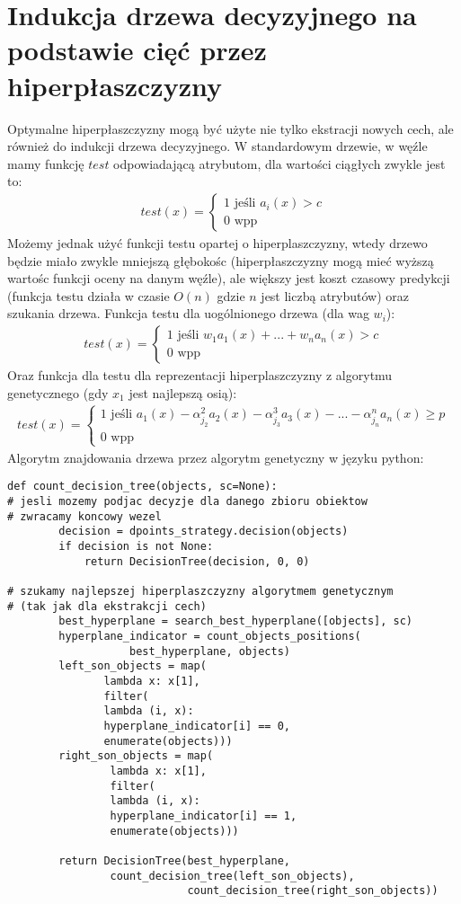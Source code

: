 \documentclass[magisterska]{pracamgr}
\theoremstyle{plain}
\theoremstyle{definition}
\theoremstyle{remark}
\begin{document}
\section{Indukcja drzewa decyzyjnego na podstawie cięć przez hiperpłaszczyzny}
Optymalne hiperpłaszczyzny mogą być użyte nie tylko ekstracji nowych cech, ale również do indukcji drzewa
decyzyjnego. W standardowym drzewie, w węźle mamy funkcję $test$ odpowiadającą atrybutom, dla wartości ciągłych zwykle
jest to:
\begin{align*}
test(x) = \begin{cases} 1 \text{ jeśli } a_i(x) > c \\ 0 \text{ wpp } \end{cases}
\end{align*}
Możemy jednak użyć funkcji testu opartej o hiperplaszczyzny, wtedy drzewo będzie miało zwykle mniejszą głębokośc
(hiperpłaszczyzny mogą mieć wyższą wartośc funkcji oceny na danym węźle), ale większy jest koszt czasowy predykcji
(funkcja testu działa w czasie $O(n)$ gdzie $n$ jest liczbą atrybutów) oraz szukania drzewa. Funkcja testu dla 
uogólnionego drzewa (dla wag $w_i$):
  \begin{align*}
test(x) = \begin{cases} 1 \text{ jeśli } w_1 a_1(x) + ... + w_n a_n(x) > c \\ 0 \text{ wpp } \end{cases}
\end{align*}
Oraz funkcja dla testu dla reprezentacji hiperplaszczyzny z algorytmu genetycznego (gdy $x_1$ jest najlepszą osią):
\begin{align*}
 test(x) = \begin{cases} 1 \text{ jeśli } a_1(x) - \alpha_{j_2}^2 a_2(x) - \alpha_{j_3}^3 a_3(x) - 
 ... - \alpha_{j_n}^n a_n(x) \geq p \\ 0 \text{ wpp } \end{cases}
\end{align*}
Algorytm znajdowania drzewa przez algorytm genetyczny w języku python:
\begin{lstlisting}
def count_decision_tree(objects, sc=None):
# jesli mozemy podjac decyzje dla danego zbioru obiektow
# zwracamy koncowy wezel
        decision = dpoints_strategy.decision(objects)
        if decision is not None:
            return DecisionTree(decision, 0, 0)

# szukamy najlepszej hiperplaszczyzny algorytmem genetycznym
# (tak jak dla ekstrakcji cech)
        best_hyperplane = search_best_hyperplane([objects], sc)
        hyperplane_indicator = count_objects_positions(
			       best_hyperplane, objects)
        left_son_objects = map(
			   lambda x: x[1], 
			   filter(
			   lambda (i, x): 
			   hyperplane_indicator[i] == 0, 
			   enumerate(objects)))
        right_son_objects = map(
			    lambda x: x[1], 
			    filter(
			    lambda (i, x): 
			    hyperplane_indicator[i] == 1, 
			    enumerate(objects)))

        return DecisionTree(best_hyperplane, 
			    count_decision_tree(left_son_objects),
                            count_decision_tree(right_son_objects))
\end{lstlisting}
\end{document}
